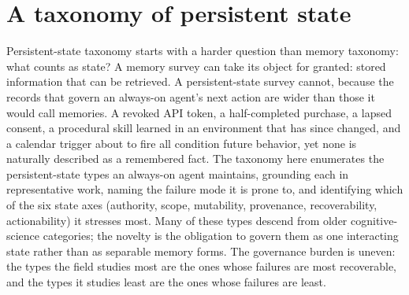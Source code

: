 \section{A taxonomy of persistent state}\label{sec:statetax}


Persistent-state taxonomy starts with a harder question than memory taxonomy: what counts as state? A memory survey can take its object for granted: stored information that can be retrieved. A persistent-state survey cannot, because the records that govern an always-on agent's next action are wider than those it would call memories. A revoked API token, a half-completed purchase, a lapsed consent, a procedural skill learned in an environment that has since changed, and a calendar trigger about to fire all condition future behavior, yet none is naturally described as a remembered fact. The taxonomy here enumerates the persistent-state types an always-on agent maintains, grounding each in representative work, naming the failure mode it is prone to, and identifying which of the six state axes (authority, scope, mutability, provenance, recoverability, actionability) it stresses most. Many of these types descend from older cognitive-science categories; the novelty is the obligation to govern them as one interacting state rather than as separable memory forms. The governance burden is uneven: the types the field studies most are the ones whose failures are most recoverable, and the types it studies least are the ones whose failures are least.

